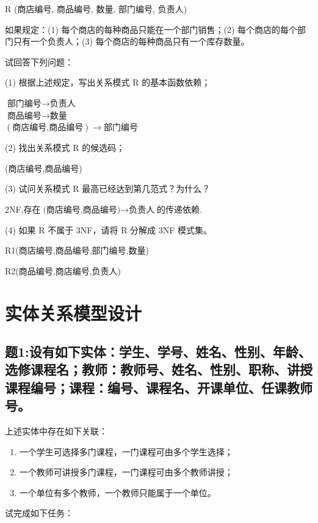 \documentclass[a4paper,12pt,UTF8,fontset=none]{ctexart}
\begin{document}
   R (商店编号, 商品编号, 数量, 部门编号, 负责人)

   如果规定：(1) 每个商店的每种商品只能在一个部门销售；(2) 每个商店的每个部门只有一个负责人；(3) 每个商店的每种商品只有一个库存数量。

   试回答下列问题：

   (1) 根据上述规定，写出关系模式 R 的基本函数依赖；
   \begin{center}
   $\text{部门编号} \rightarrow \text{负责人}$\\
   $\text{商品编号} \rightarrow \text{数量}$\\
   $(\text{商店编号,商品编号}) \rightarrow \text{部门编号}$\\
   \end{center}

   (2) 找出关系模式 R 的候选码；
   \par (商店编号,商品编号)

   (3) 试问关系模式 R 最高已经达到第几范式？为什么？
   \par 2NF,存在$\mbox{(商店编号,商品编号)} \rightarrow \mbox{负责人}$的传递依赖.

   (4) 如果 R 不属于 3NF，请将 R 分解成 3NF 模式集。
   \par R1(商店编号,商品编号,部门编号,数量)

   R2(商品编号,商店编号,负责人)
\section{实体关系模型设计}

   \subsection*{题1:设有如下实体：学生、学号、姓名、性别、年龄、选修课程名；教师：教师号、姓名、性别、职称、讲授课程编号；课程：编号、课程名、开课单位、任课教师号。}
   
   上述实体中存在如下关联：
   
   \begin{enumerate}
       \item 一个学生可选择多门课程，一门课程可由多个学生选择；
       \item 一个教师可讲授多门课程，一门课程可由多个教师讲授；
       \item 一个单位有多个教师，一个教师只能属于一个单位。
   \end{enumerate}
   
   试完成如下任务：
   
\end{document}
